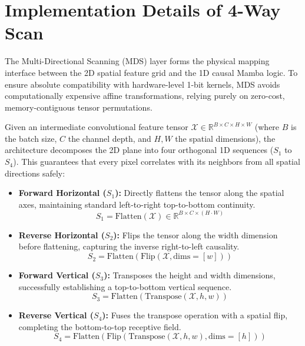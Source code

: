 \documentclass[journal]{IEEEtran}
\begin{document}
\section{Implementation Details of 4-Way Scan}
The Multi-Directional Scanning (MDS) layer forms the physical mapping interface between the 2D spatial feature grid and the 1D causal Mamba logic. To ensure absolute compatibility with hardware-level 1-bit kernels, MDS avoids computationally expensive affine transformations, relying purely on zero-cost, memory-contiguous tensor permutations. 

Given an intermediate convolutional feature tensor $\mathcal{X} \in \mathbb{R}^{B \times C \times H \times W}$ (where $B$ is the batch size, $C$ the channel depth, and $H, W$ the spatial dimensions), the architecture decomposes the 2D plane into four orthogonal 1D sequences ($S_1$ to $S_4$). This guarantees that every pixel correlates with its neighbors from all spatial directions safely:
\begin{itemize}
    \item \textbf{Forward Horizontal ($S_1$):} Directly flattens the tensor along the spatial axes, maintaining standard left-to-right top-to-bottom continuity.
    \begin{equation*} S_1 = \text{Flatten}(\mathcal{X}) \in \mathbb{R}^{B \times C \times (H \cdot W)} \end{equation*}
    \item \textbf{Reverse Horizontal ($S_2$):} Flips the tensor along the width dimension before flattening, capturing the inverse right-to-left causality.
    \begin{equation*} S_2 = \text{Flatten}(\text{Flip}(\mathcal{X}, \text{dims}=[w])) \end{equation*}
    \item \textbf{Forward Vertical ($S_3$):} Transposes the height and width dimensions, successfully establishing a top-to-bottom vertical sequence.
    \begin{equation*} S_3 = \text{Flatten}(\text{Transpose}(\mathcal{X}, h, w)) \end{equation*}
    \item \textbf{Reverse Vertical ($S_4$):} Fuses the transpose operation with a spatial flip, completing the bottom-to-top receptive field.
    \begin{equation*} S_4 = \text{Flatten}(\text{Flip}(\text{Transpose}(\mathcal{X}, h, w), \text{dims}=[h])) \end{equation*}
\end{itemize}
\end{document}
